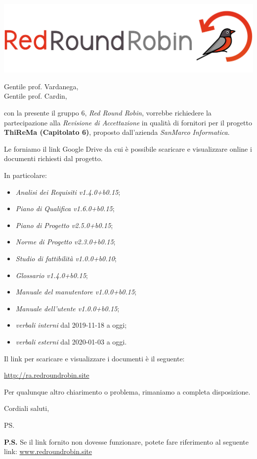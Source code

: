 \documentclass[12pt]{letter}
\date{15 maggio 2020}
\begin{document}
\begin{letter}{ }

\includegraphics[scale=0.17]{images/logo.png}

\opening{Gentile prof. Vardanega,\\ Gentile prof. Cardin, }

con la presente il gruppo 6, \textit{Red Round Robin}, vorrebbe richiedere la partecipazione alla \textit{Revisione di Accettazione} in qualità di fornitori per il progetto \textbf{ThiReMa (Capitolato 6)}, proposto dall'azienda \textit{SanMarco Informatica}.
\newline

Le forniamo il link Google Drive da cui è possibile scaricare e visualizzare online i documenti richiesti dal progetto.

In particolare:

\begin{itemize}
  	\item \textit{Analisi dei Requisiti v1.4.0+b0.15};
	\item \textit{Piano di Qualifica v1.6.0+b0.15};
	\item \textit{Piano di Progetto v2.5.0+b0.15};
	\item \textit{Norme di Progetto v2.3.0+b0.15};
	\item \textit{Studio di fattibilità v1.0.0+b0.10};
	\item \textit{Glossario v1.4.0+b0.15};
	\item \textit{Manuale del manutentore v1.0.0+b0.15};
	\item \textit{Manuale dell'utente v1.0.0+b0.15};
	\item \textit{verbali interni} dal 2019-11-18 a oggi;
	\item \textit{verbali esterni} dal 2020-01-03 a oggi.
\end{itemize}

Il link per scaricare e visualizzare i documenti è il seguente:

\begin{center}
\href{https://drive.google.com/drive/folders/1Bgp4GlxOqch6fmSjvgfuCC3z8yf3zROB?usp=sharing}{http://ra.redroundrobin.site}
\end{center}


Per qualunque altro chiarimento o problema, rimaniamo a completa disposizione.

\closing{Cordiali saluti,}


\vspace{3em}
\ps

\textbf{P.S.} Se il link fornito non dovesse funzionare, potete fare riferimento al seguente link:
\href{https://www.redroundrobin.site}{www.redroundrobin.site}

\end{letter}
\end{document}
